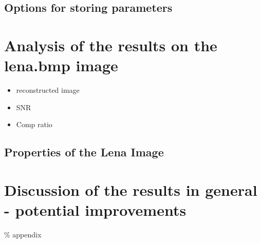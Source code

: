 \documentclass[a4paper]{article}
\begin{document}
\subsection{Options for storing parameters}

\section{Analysis of the results on the lena.bmp image}
\begin{itemize}

    \item reconstructed image

    \item SNR

    \item Comp ratio
\end{itemize}

\subsection{Properties of the Lena Image}


\section{Discussion of the results in general - potential improvements}

%     
%         

\clearpage
\% appendix 
% 
% 
\end{document}
